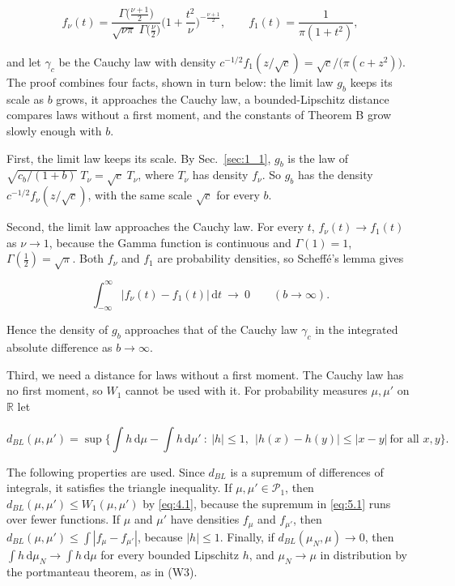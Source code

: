 \documentclass[aip,jmp,preprint,onecolumn,floatfix,superscriptaddress,nofootinbib,11pt]{revtex4-2}
\theoremstyle{plain}
\theoremstyle{remark}
\numberwithin{equation}{section}
\newcommand{\dd}{\mathrm{d}}
\begin{document}
\begin{equation*}
f_\nu(t)=\frac{\Gamma\big(\frac{\nu+1}{2}\big)}{\sqrt{\nu\pi}\;\Gamma\big(\frac\nu2\big)}\Big(1+\frac{t^{2}}{\nu}\Big)^{-\frac{\nu+1}{2}},\qquad f_1(t)=\frac{1}{\pi(1+t^{2})},
\end{equation*}

and let $\gamma_c$ be the Cauchy law with density $c^{-1/2}f_1(z/\sqrt c)=\sqrt c/\big(\pi(c+z^{2})\big)$. The proof combines four facts, shown in turn below: the limit law $g_b$ keeps its scale as $b$ grows, it approaches the Cauchy law, a bounded-Lipschitz distance compares laws without a first moment, and the constants of Theorem B grow slowly enough with $b$.

First, the limit law keeps its scale. By Sec.~\ref{sec:1_1}, $g_b$ is the law of $\sqrt{c_b/(1+b)}\;T_\nu=\sqrt c\;T_\nu$, where $T_\nu$ has density $f_\nu$. So $g_b$ has the density $c^{-1/2}f_\nu(z/\sqrt c)$, with the same scale $\sqrt c$ for every $b$.

Second, the limit law approaches the Cauchy law. For every $t$, $f_\nu(t)\to f_1(t)$ as $\nu\to1$, because the Gamma function is continuous and $\Gamma(1)=1$, $\Gamma(\tfrac12)=\sqrt\pi$. Both $f_\nu$ and $f_1$ are probability densities, so Scheff\'e's lemma gives

\begin{equation}
\int_{-\infty}^{\infty}\big|f_\nu(t)-f_1(t)\big|\,\dd t\ \longrightarrow\ 0\qquad(b\to\infty).
\label{eq:scheffe}
\end{equation}

Hence the density of $g_b$ approaches that of the Cauchy law $\gamma_c$ in the integrated absolute difference as $b\to\infty$.

Third, we need a distance for laws without a first moment. The Cauchy law has no first moment, so $W_1$ cannot be used with it. For probability measures $\mu,\mu'$ on $\mathbb R$ let

\begin{equation}
d_{BL}(\mu,\mu')=\sup\Big\{\int h\,\dd\mu-\int h\,\dd\mu'\ :\ |h|\le1,\ \ |h(x)-h(y)|\le|x-y|\ \text{for all }x,y\Big\}.
\label{eq:5.1}
\end{equation}

The following properties are used. Since $d_{BL}$ is a supremum of differences of integrals, it satisfies the triangle inequality. If $\mu,\mu'\in\mathcal P_1$, then $d_{BL}(\mu,\mu')\le W_1(\mu,\mu')$ by \eqref{eq:4.1}, because the supremum in \eqref{eq:5.1} runs over fewer functions. If $\mu$ and $\mu'$ have densities $f_\mu$ and $f_{\mu'}$, then $d_{BL}(\mu,\mu')\le\int|f_\mu-f_{\mu'}|$, because $|h|\le1$. Finally, if $d_{BL}(\mu_N,\mu)\to0$, then $\int h\,\dd\mu_N\to\int h\,\dd\mu$ for every bounded Lipschitz $h$, and $\mu_N\to\mu$ in distribution by the portmanteau theorem, as in (W3).
\end{document}

